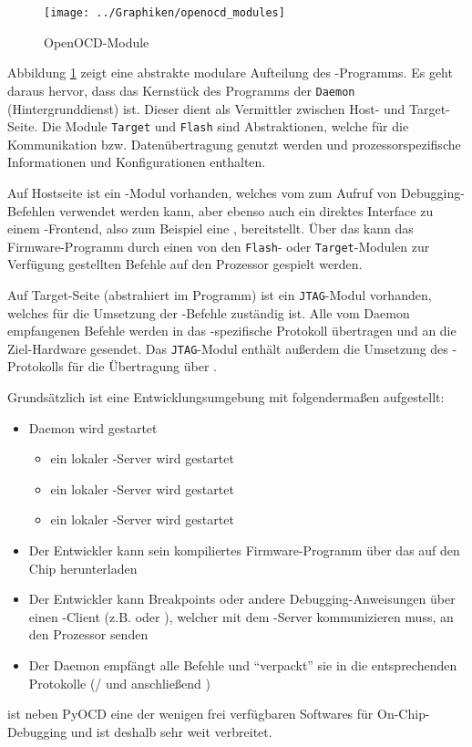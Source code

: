 	\begin{figure}
        \centering
        \caption{OpenOCD-Module}
        \label{fig:openocdmodules}
        \texttt{[image: ../Graphiken/openocd\_modules]}
    \end{figure}

	Abbildung \ref{fig:openocdmodules} zeigt eine abstrakte modulare Aufteilung des -Programms. Es geht daraus
	hervor, dass das Kernstück des Programms der \texttt{Daemon} (Hintergrunddienst) ist. Dieser dient als Vermittler zwischen Host- und
	Target-Seite. Die Module \texttt{Target} und \texttt{Flash} sind Abstraktionen, welche für die Kommunikation bzw.
	Datenübertragung genutzt werden und prozessorspezifische Informationen und Konfigurationen enthalten.

	Auf Hostseite ist ein \texttt{}-Modul vorhanden, welches vom 
	zum Aufruf von Debugging-Befehlen verwendet werden kann, aber ebenso auch ein direktes Interface zu einem
	-Frontend, also zum Beispiel eine , bereitstellt.
	Über das  kann das Firmware-Programm durch einen
	von den \texttt{Flash}- oder \texttt{Target}-Modulen zur Verfügung gestellten Befehle auf den Prozessor gespielt werden.

	Auf Target-Seite (abstrahiert im Programm) ist ein \texttt{JTAG}-Modul vorhanden, welches für die Umsetzung der
	-Befehle zuständig ist. Alle vom Daemon empfangenen Befehle werden in das -spezifische Protokoll übertragen
	und an die Ziel-Hardware gesendet. Das \texttt{JTAG}-Modul enthält außerdem die Umsetzung des
	-Protokolls für die Übertragung über .

	Grundsätzlich ist eine Entwicklungsumgebung mit  folgendermaßen aufgestellt:

	\begin{itemize}
	    \item {} Daemon wird gestartet
	    \begin{itemize}
	        \item ein lokaler -Server wird gestartet
	        \item ein lokaler -Server wird gestartet
	        \item ein lokaler -Server wird gestartet
	    \end{itemize}
	    \item Der Entwickler kann sein kompiliertes Firmware-Programm über das  auf den Chip herunterladen
	    \item Der Entwickler kann Breakpoints oder andere Debugging-Anweisungen über einen -Client
	    (z.B.  oder ), welcher mit dem -Server kommunizieren muss, an den Prozessor senden
	    \item Der Daemon empfängt alle Befehle und ``verpackt'' sie in die entsprechenden Protokolle
	    (/ und anschließend )
	\end{itemize}

	 ist neben PyOCD eine der wenigen frei verfügbaren Softwares für On-Chip-Debugging und ist
	deshalb sehr weit verbreitet.